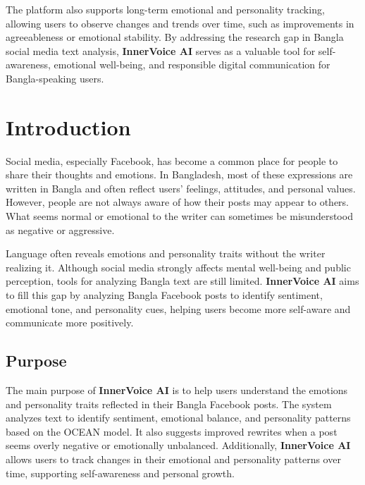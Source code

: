 \documentclass[12pt,a4paper]{report}
\begin{document}
The platform also supports long-term emotional and personality tracking, allowing users to observe changes and trends over time, such as improvements in agreeableness or emotional stability. By addressing the research gap in Bangla social media text analysis, \textbf{InnerVoice AI} serves as a valuable tool for self-awareness, emotional well-being, and responsible digital communication for Bangla-speaking users.

\clearpage

\tableofcontents
\listoffigures
\listoftables

\chapter{Introduction}

Social media, especially Facebook, has become a common place for people to share their thoughts and emotions. In Bangladesh, most of these expressions are written in Bangla and often reflect users' feelings, attitudes, and personal values. However, people are not always aware of how their posts may appear to others. What seems normal or emotional to the writer can sometimes be misunderstood as negative or aggressive.

Language often reveals emotions and personality traits without the writer realizing it. Although social media strongly affects mental well-being and public perception, tools for analyzing Bangla text are still limited. \textbf{InnerVoice AI} aims to fill this gap by analyzing Bangla Facebook posts to identify sentiment, emotional tone, and personality cues, helping users become more self-aware and communicate more positively.

\section{Purpose}

The main purpose of \textbf{InnerVoice AI} is to help users understand the emotions and personality traits reflected in their Bangla Facebook posts. The system analyzes text to identify sentiment, emotional balance, and personality patterns based on the OCEAN model. It also suggests improved rewrites when a post seems overly negative or emotionally unbalanced. Additionally, \textbf{InnerVoice AI} allows users to track changes in their emotional and personality patterns over time, supporting self-awareness and personal growth.
\end{document}
